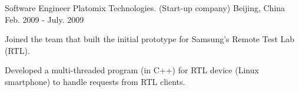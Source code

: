 \begin{cventries}
  \cventry
    {Software Engineer} %
    {Platomix Technologies. (Start-up company)} %
    {Beijing, China} %
    {Feb. 2009 - July. 2009} %
    {
      \begin{cvitems} %
       \item {Joined the team that built the initial prototype for
    Samsung's Remote Test Lab (RTL).}
       \item {Developed a multi-threaded program (in C++) for RTL
    device (Linux smartphone) to handle requests from RTL clients.}
      \end{cvitems}
    }


\end{cventries}
